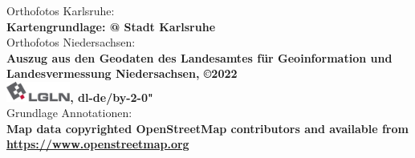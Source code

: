 \pagebreak
\hspace{0pt}
\vfill
\begin{center}
	Orthofotos Karlsruhe:\\\textbf{Kartengrundlage: @ Stadt Karlsruhe} \\
    \vspace*{2cm}
    Orthofotos Niedersachsen:\\
    \textbf{Auszug aus den Geodaten des Landesamtes für Geoinformation und Landesvermessung Niedersachsen, ©2022} \\
    \includegraphics[height=0.65cm]{Bilder/Logos/lgln.png}\textbf{, dl-de/by-2-0"} \\
    \vspace*{2cm}
    Grundlage Annotationen: \\
    \textbf{Map data copyrighted OpenStreetMap contributors and available from \url{https://www.openstreetmap.org}}
\end{center}
\vfill
\hspace{0pt}
\pagebreak